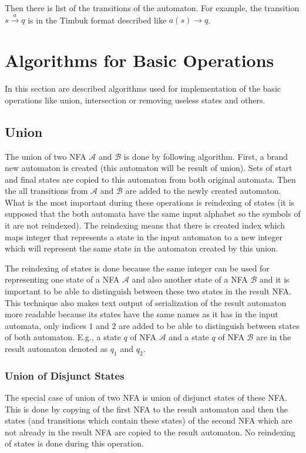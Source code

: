 Then there is list of the transitions of the automaton. 
For example, the transition $s \xrightarrow{a} q$ is in the Timbuk format described like $a(s)\rightarrow q$.

\section{Algorithms for Basic Operations}
In this section are described algorithms used for implementation of the basic operations like union, intersection or removing useless states and others. 

\subsection{Union}
The union of two NFA $\mathcal{A}$ and $\mathcal{B}$ is done by following algorithm. First, a brand new automaton is created (this automaton
will be result of union). Sets of start and final states are copied to this automaton from both original automata. Then the all transitions from $\mathcal{A}$ and
$\mathcal{B}$ are added to the newly created automaton. What is the most important during these operations is reindexing of states (it is supposed
that the both automata have the same input alphabet so the symbols of it are not reindexed). The reindexing means that there is created index which maps
integer that represents a state in the input automaton to a new integer which will represent the same state in the automaton created by this union.

The reindexing of states is done because the same integer can be used for representing one state of a NFA $\mathcal{A}$ 
and also another state of a NFA $\mathcal{B}$ and it is important
to be able to distinguish between these two states in the result NFA. This technique also makes text output of serialization of the result automaton 
more readable because its states have the same names as it has in the input automata, only indices $1$ and $2$ are added to be able to 
distinguish between states of both automaton. E.g., a state $q$ of NFA $\mathcal{A}$ and a state $q$ of NFA $\mathcal{B}$ are in the result automaton denoted
as $q_1$ and $q_2$.

\subsubsection{Union of Disjunct States}
The special case of union of two NFA is union of disjunct states of these NFA. This is done by copying of the first NFA to the result automaton and then
the states (and transitions which contain these states) of the second NFA which are not already in the result NFA are copied to the result automaton.
No reindexing of states is done during this operation.

